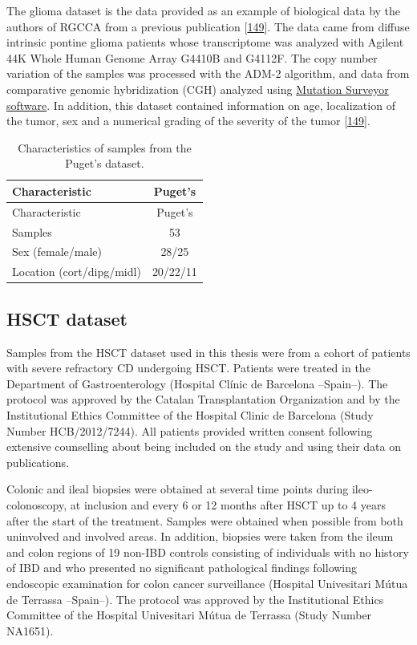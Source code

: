 \documentclass[
  12pt,
  a4paper,
  twoside,
  openright]{book}
\begin{document}
The glioma dataset is the data provided as an example of biological data by the authors of RGCCA from a previous publication {[}\protect\hyperlink{ref-puget2012}{149}{]}.
The data came from diffuse intrinsic pontine glioma patients whose transcriptome was analyzed with Agilent 44K Whole Human Genome Array G4410B and G4112F.
The copy number variation of the samples was processed with the ADM-2 algorithm, and data from comparative genomic hybridization (CGH) analyzed using \href{https://www.softgenetics.com/mutationSurveyor.php}{Mutation Surveyor software}.
In addition, this dataset contained information on age, localization of the tumor, sex and a numerical grading of the severity of the tumor {[}\protect\hyperlink{ref-puget2012}{149}{]}.

\begin{longtable}[]{@{}lc@{}}
\caption{\label{tab:Puget} Characteristics of samples from the Puget's dataset.}\tabularnewline
\toprule
Characteristic & Puget's \\
\midrule
\endfirsthead
\toprule
Characteristic & Puget's \\
\midrule
\endhead
Samples & 53 \\
Sex (female/male) & 28/25 \\
Location (cort/dipg/midl) & 20/22/11 \\
\bottomrule
\end{longtable}

\hypertarget{methods-hsct}{%
\subsection{HSCT dataset}\label{methods-hsct}}

Samples from the HSCT dataset used in this thesis were from a cohort of patients with severe refractory CD undergoing HSCT.
Patients were treated in the Department of Gastroenterology (Hospital Clínic de Barcelona --Spain--).
The protocol was approved by the Catalan Transplantation Organization and by the Institutional Ethics Committee of the Hospital Clinic de Barcelona (Study Number HCB/2012/7244).
All patients provided written consent following extensive counselling about being included on the study and using their data on publications.

Colonic and ileal biopsies were obtained at several time points during ileo-colonoscopy, at inclusion and every 6 or 12 months after HSCT up to 4 years after the start of the treatment.
Samples were obtained when possible from both uninvolved and involved areas.
In addition, biopsies were taken from the ileum and colon regions of 19 non-IBD controls consisting of individuals with no history of IBD and who presented no significant pathological findings following endoscopic examination for colon cancer surveillance (Hospital Univesitari Mútua de Terrassa --Spain--).
The protocol was approved by the Institutional Ethics Committee of the Hospital Univesitari Mútua de Terrassa (Study Number NA1651).
\end{document}
